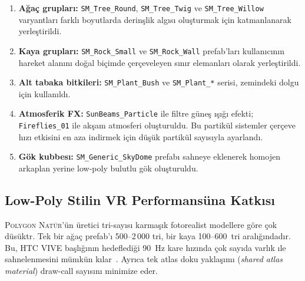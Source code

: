 \documentclass[11pt,a4paper]{article}
\begin{document}
\begin{enumerate}[nosep]
    \item \textbf{A\u{g}a\c{c} gruplar{\i}:} \texttt{SM\_Tree\_Round},
          \texttt{SM\_Tree\_Twig} ve \texttt{SM\_Tree\_Willow}
          varyantlar{\i} farkl{\i} boyutlarda derin\c{s}lik
          alg{\i}s{\i} olu\c{s}turmak i\c{c}in katmanlanarak yerle\c{s}tirildi.

    \item \textbf{Kaya gruplar{\i}:} \texttt{SM\_Rock\_Small} ve
          \texttt{SM\_Rock\_Wall} prefab'lar{\i} kullan{\i}c{\i}n{\i}n
          hareket alan{\i}n{\i} do\u{g}al bi\c{c}imde \c{c}er\c{c}eveleyen
          s{\i}n{\i}r elemanlar{\i} olarak yerle\c{s}tirildi.

    \item \textbf{Alt tabaka bitkileri:} \texttt{SM\_Plant\_Bush} ve
          \texttt{SM\_Plant\_*} serisi, zemindeki dolgu i\c{c}in
          kullan{\i}ld{\i}.

    \item \textbf{Atmosferik FX:} \texttt{SunBeams\_Particle} ile
          filtre g\"une\c{s} {\i}\c{s}{\i}\u{g}{\i} efekti;
          \texttt{Fireflies\_01} ile ak\c{s}am atmosferi
          olu\c{s}turuldu. Bu partik\"ul sistemler \c{c}er\c{c}eve h{\i}z{\i}
          etkisini en aza indirmek i\c{c}in d\"u\c{s}\"uk partik\"ul
          say{\i}s{\i}yla ayarland{\i}.

    \item \textbf{G\"ok kubbes{\i}:} \texttt{SM\_Generic\_SkyDome}
          prefab{\i} sahneye eklenerek homojen arkaplan yerine
          low-poly bulutlu g\"ok olu\c{s}turuldu.
\end{enumerate}

\subsection{Low-Poly Stilin VR Performans\"una Katk{\i}s{\i}}

\textsc{Polygon Nat\"ur}'\"un \"uretici tri-say{\i}s{\i}
karmaşık fotorealist modellere g\"ore \c{c}ok d\"us\"uktr.
Tek bir ağaç prefab'{\i} 500--2\,000 tri, bir kaya 100--600~tri
aral{\i}\u{g}{\i}ndad{\i}r. Bu, HTC VIVE ba\c{s}l{\i}\u{g}{\i}n{\i}n
hedefledi\u{g}i 90~Hz kare h{\i}z{\i}nda \c{c}ok say{\i}da varlık
{\i}le sahnelenmesini m\"umk\"un k{\i}lar~\cite{jerald2015}.
Ayr{\i}ca tek atlas doku yakla\c{s}{\i}m{\i} (\textit{shared atlas
material}) draw-call say{\i}s{\i}n{\i} minimize eder.

\end{document}

